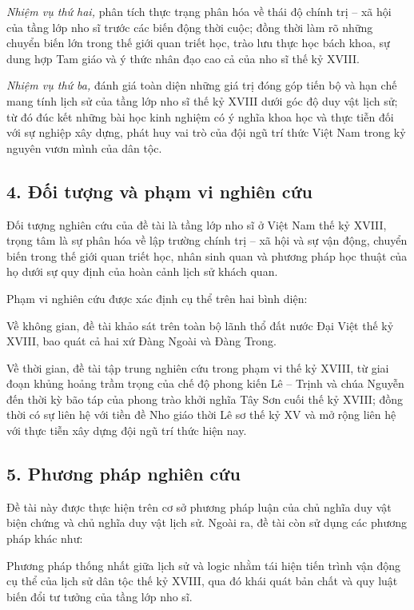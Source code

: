 \textit{Nhiệm vụ thứ hai,} phân tích thực trạng phân hóa về thái độ chính trị -- xã hội của tầng lớp nho sĩ trước các biến động thời cuộc; đồng thời làm rõ những chuyển biến lớn trong thế giới quan triết học, trào lưu thực học bách khoa, sự dung hợp Tam giáo và ý thức nhân đạo cao cả của nho sĩ thế kỷ XVIII.

\textit{Nhiệm vụ thứ ba,} đánh giá toàn diện những giá trị đóng góp tiến bộ và hạn chế mang tính lịch sử của tầng lớp nho sĩ thế kỷ XVIII dưới góc độ duy vật lịch sử; từ đó đúc kết những bài học kinh nghiệm có ý nghĩa khoa học và thực tiễn đối với sự nghiệp xây dựng, phát huy vai trò của đội ngũ trí thức Việt Nam trong kỷ nguyên vươn mình của dân tộc.

\subsection*{4. Đối tượng và phạm vi nghiên cứu}

Đối tượng nghiên cứu của đề tài là tầng lớp nho sĩ ở Việt Nam thế kỷ XVIII, trọng tâm là sự phân hóa về lập trường chính trị -- xã hội và sự vận động, chuyển biến trong thế giới quan triết học, nhân sinh quan và phương pháp học thuật của họ dưới sự quy định của hoàn cảnh lịch sử khách quan.

Phạm vi nghiên cứu được xác định cụ thể trên hai bình diện:

Về không gian, đề tài khảo sát trên toàn bộ lãnh thổ đất nước Đại Việt thế kỷ XVIII, bao quát cả hai xứ Đàng Ngoài và Đàng Trong.

Về thời gian, đề tài tập trung nghiên cứu trong phạm vi thế kỷ XVIII, từ giai đoạn khủng hoảng trầm trọng của chế độ phong kiến Lê -- Trịnh và chúa Nguyễn đến thời kỳ bão táp của phong trào khởi nghĩa Tây Sơn cuối thế kỷ XVIII; đồng thời có sự liên hệ với tiền đề Nho giáo thời Lê sơ thế kỷ XV và mở rộng liên hệ với thực tiễn xây dựng đội ngũ trí thức hiện nay.

\subsection*{5. Phương pháp nghiên cứu}

Đề tài này được thực hiện trên cơ sở phương pháp luận của chủ nghĩa duy vật biện chứng và chủ nghĩa duy vật lịch sử. Ngoài ra, đề tài còn sử dụng các phương pháp khác như:

Phương pháp thống nhất giữa lịch sử và logic nhằm tái hiện tiến trình vận động cụ thể của lịch sử dân tộc thế kỷ XVIII, qua đó khái quát bản chất và quy luật biến đổi tư tưởng của tầng lớp nho sĩ.

